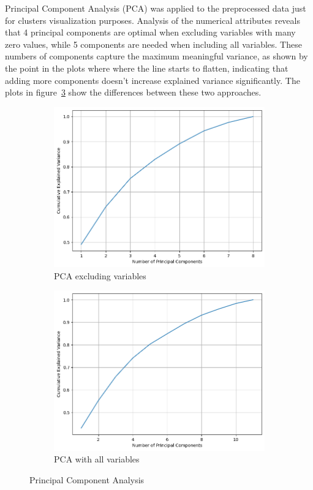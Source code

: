 Principal Component Analysis (PCA) was applied to the preprocessed data just for clusters visualization purposes. 
Analysis of the numerical attributes reveals that 4 principal components are optimal when excluding variables with many zero values, while 5 components are needed when including all variables. 
These numbers of components capture the maximum meaningful variance, as shown by the point in the plots where where the line starts to flatten, indicating that adding more components doesn't increase explained variance significantly. 
The plots in figure~\ref{fig:pca_diff} show the differences between these two approaches.
\begin{figure}[h]
    \centering
    \begin{subfigure}[b]{0.40\textwidth}
        \centering
        \includegraphics[width=\textwidth]{plots/pca_kmeans.png}
        \caption{PCA excluding variables}
        \label{fig:sse_silh_kmeans}
    \end{subfigure}
    \begin{subfigure}[b]{0.40\textwidth}
        \centering
        \includegraphics[width=\textwidth]{plots/pca5.png}
        \caption{PCA with all variables}
        \label{fig:pca5}
    \end{subfigure}
    \caption{Principal Component Analysis}
    \label{fig:pca_diff}
\end{figure}
